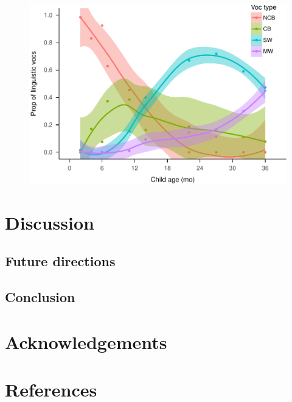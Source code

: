 \documentclass[floatsintext,man]{apa6}
\theoremstyle{definition}
\theoremstyle{definition}
\theoremstyle{definition}
\theoremstyle{remark}
\begin{document}
\begin{figure}
\centering
\includegraphics{Tseltal-CLE_files/figure-latex/plot_chi_voctypes_overall-1.pdf}
\caption{}
\end{figure}

\section{Discussion}\label{disc}

\subsection{Future directions}\label{disc-future}

\subsection{Conclusion}\label{disc-conclusion}

\section{Acknowledgements}\label{acknowledgements}

\newpage

\section{References}\label{refs}

\begingroup
\setlength{\parindent}{-0.5in} \setlength{\leftskip}{0.5in}

\hypertarget{refs}{}

\endgroup
\end{document}
